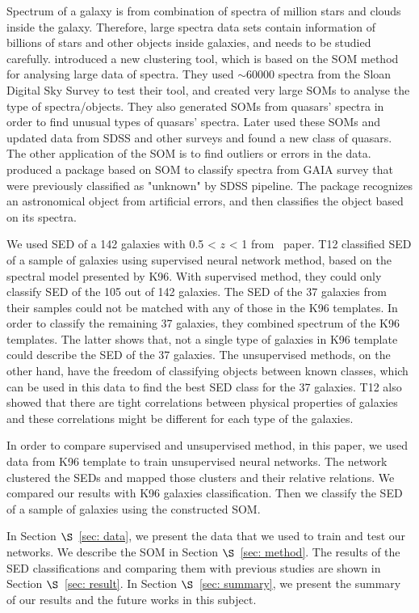 Spectrum of a galaxy is from combination of spectra of million stars and clouds inside the galaxy.
Therefore, large spectra data sets contain information of billions of stars and other objects inside galaxies, and needs to be studied carefully. %
\citet{In12} introduced a new clustering tool, which is based on the SOM method for analysing large data of spectra.
They used $\sim 60000$ spectra from the Sloan Digital Sky Survey \citep[SDSS;][]{Abazajian09}
to test their tool, and created very large SOMs to analyse the type of spectra/objects.
They also generated SOMs from quasars' spectra in order to find unusual types of quasars' spectra. Later \citet{Meusinger16} used these SOMs and updated data from SDSS and other surveys and found a new class of quasars.
The other application of the SOM is to find outliers or errors in the data.
\citet{Fustes13} produced a package based on SOM to classify spectra from GAIA survey that were previously classified as "unknown" by SDSS pipeline. The package recognizes an astronomical object from artificial errors, and then classifies the object based on its spectra.

We used SED of a 142 galaxies with 0.5 < $z$ < 1 from~\citet[][hereafter T12]{Hossein12} paper.
T12 classified SED of a sample of galaxies using supervised neural network method, based on the spectral model presented by K96.
With supervised method, they could only classify SED of the 105 out of 142 galaxies.
The SED of the 37 galaxies from their samples could not be matched with any of those in the K96 templates. 
In order to classify the remaining 37 galaxies, they combined spectrum of the K96 templates.
The latter shows that, not a single type of galaxies in K96 template could describe the SED of the 37 galaxies.
The unsupervised methods, on the other hand, have the freedom of classifying objects between known classes, which can be used in this data to find the best SED class for the 37 galaxies.
T12 also showed that there are tight correlations between physical properties of galaxies and these correlations might be different for each type of the galaxies.

In order to compare supervised and unsupervised method, in this paper, we used data from K96 template to train unsupervised neural networks. 
The network clustered the SEDs and mapped those clusters and their relative relations.
We compared our results with K96 galaxies classification.
Then we classify the SED of a sample of galaxies using the constructed SOM.

 In Section $\S$~\ref{sec: data}, we present the data that we used to train and test our networks. We describe the SOM in Section $\S$~\ref{sec: method}. The results of the SED classifications and comparing them with previous studies are shown in Section $\S$~\ref{sec: result}. In Section $\S$~\ref{sec: summary}, we present the summary of our results and the future works in this subject.
